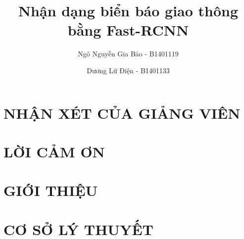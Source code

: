 \documentclass[a4paper,12pt,oneside]{report}
\title{Nhận dạng biển báo giao thông bằng Fast-RCNN}						%
\author{Ngô Nguyễn Gia Bảo - B1401119 \and Dương Lữ Điện - B1401133}		%
\begin{document}


\chapter*{NHẬN XÉT CỦA GIẢNG VIÊN}


\chapter*{LỜI CẢM ƠN}


\tableofcontents
\listoffigures

\clearpage
{}	%

\chapter{GIỚI THIỆU}


\chapter{CƠ SỞ LÝ THUYẾT}

% 
% 
% 
% 
% 
% 

{}

\end{document}
